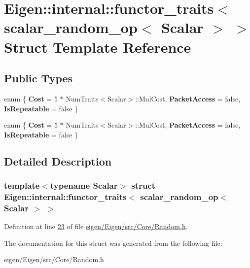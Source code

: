 \hypertarget{struct_eigen_1_1internal_1_1functor__traits_3_01scalar__random__op_3_01_scalar_01_4_01_4}{}\section{Eigen\+:\+:internal\+:\+:functor\+\_\+traits$<$ scalar\+\_\+random\+\_\+op$<$ Scalar $>$ $>$ Struct Template Reference}
\label{struct_eigen_1_1internal_1_1functor__traits_3_01scalar__random__op_3_01_scalar_01_4_01_4}
\subsection*{Public Types}
\begin{DoxyCompactItemize}
\item 
\mbox{\label{struct_eigen_1_1internal_1_1functor__traits_3_01scalar__random__op_3_01_scalar_01_4_01_4_aa2b04658d51a5b3dba589faf67d10669}} 
enum \{ {\bfseries Cost} = 5 $\ast$ Num\+Traits$<$Scalar$>$\+:\+:Mul\+Cost, 
{\bfseries Packet\+Access} = false, 
{\bfseries Is\+Repeatable} = false
 \}
\item 
\mbox{\label{struct_eigen_1_1internal_1_1functor__traits_3_01scalar__random__op_3_01_scalar_01_4_01_4_a7b21e8014e60a323b86ee6d7a59aa2f9}} 
enum \{ {\bfseries Cost} = 5 $\ast$ Num\+Traits$<$Scalar$>$\+:\+:Mul\+Cost, 
{\bfseries Packet\+Access} = false, 
{\bfseries Is\+Repeatable} = false
 \}
\end{DoxyCompactItemize}


\subsection{Detailed Description}
\subsubsection*{template$<$typename Scalar$>$\newline
struct Eigen\+::internal\+::functor\+\_\+traits$<$ scalar\+\_\+random\+\_\+op$<$ Scalar $>$ $>$}



Definition at line \hyperlink{eigen_2_eigen_2src_2_core_2_random_8h_source_l00023}{23} of file \hyperlink{eigen_2_eigen_2src_2_core_2_random_8h_source}{eigen/\+Eigen/src/\+Core/\+Random.\+h}.



The documentation for this struct was generated from the following file\+:\begin{DoxyCompactItemize}
\item 
eigen/\+Eigen/src/\+Core/\+Random.\+h\end{DoxyCompactItemize}
